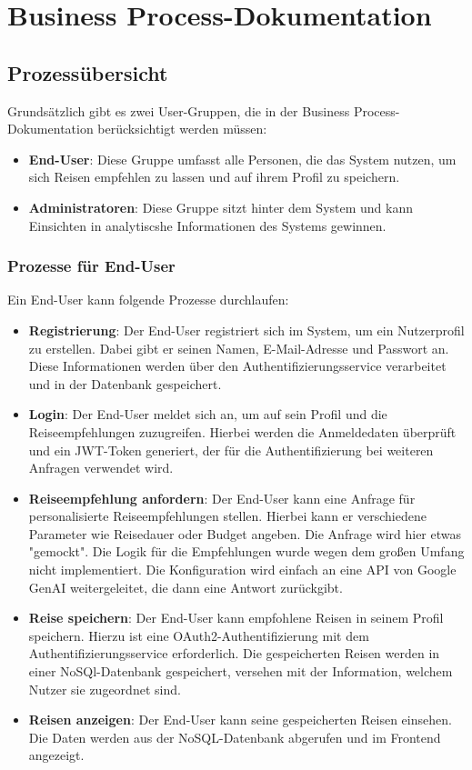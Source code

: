 \section{Business Process-Dokumentation}

\subsection{Prozessübersicht}
Grundsätzlich gibt es zwei User-Gruppen, die in der Business Process-Dokumentation berücksichtigt werden müssen:

\begin{itemize}
    \item \textbf{End-User}: Diese Gruppe umfasst alle Personen, die das System nutzen, um sich Reisen empfehlen zu lassen und auf ihrem Profil zu speichern.
    \item \textbf{Administratoren}: Diese Gruppe sitzt hinter dem System und kann Einsichten in analytiscshe Informationen des Systems gewinnen.
\end{itemize}

\subsubsection{Prozesse für End-User}

Ein End-User kann folgende Prozesse durchlaufen:

\begin{itemize}
    \item \textbf{Registrierung}: Der End-User registriert sich im System, um ein Nutzerprofil zu erstellen. Dabei gibt er seinen Namen, E-Mail-Adresse und Passwort an. Diese Informationen werden über den Authentifizierungsservice verarbeitet und in der Datenbank gespeichert.
    \item \textbf{Login}: Der End-User meldet sich an, um auf sein Profil und die Reiseempfehlungen zuzugreifen. Hierbei werden die Anmeldedaten überprüft und ein JWT-Token generiert, der für die Authentifizierung bei weiteren Anfragen verwendet wird.
    \item \textbf{Reiseempfehlung anfordern}: Der End-User kann eine Anfrage für personalisierte Reiseempfehlungen stellen. Hierbei kann er verschiedene Parameter wie Reisedauer oder Budget angeben. Die Anfrage wird hier etwas "gemockt". Die Logik für die Empfehlungen wurde wegen dem großen Umfang nicht implementiert. Die Konfiguration wird einfach an eine API von Google GenAI weitergeleitet, die dann eine Antwort zurückgibt.
    \item \textbf{Reise speichern}: Der End-User kann empfohlene Reisen in seinem Profil speichern. Hierzu ist eine OAuth2-Authentifizierung mit dem Authentifizierungsservice erforderlich. Die gespeicherten Reisen werden in einer NoSQl-Datenbank gespeichert, versehen mit der Information, welchem Nutzer sie zugeordnet sind.
    \item \textbf{Reisen anzeigen}: Der End-User kann seine gespeicherten Reisen einsehen. Die Daten werden aus der NoSQL-Datenbank abgerufen und im Frontend angezeigt.
\end{itemize}

